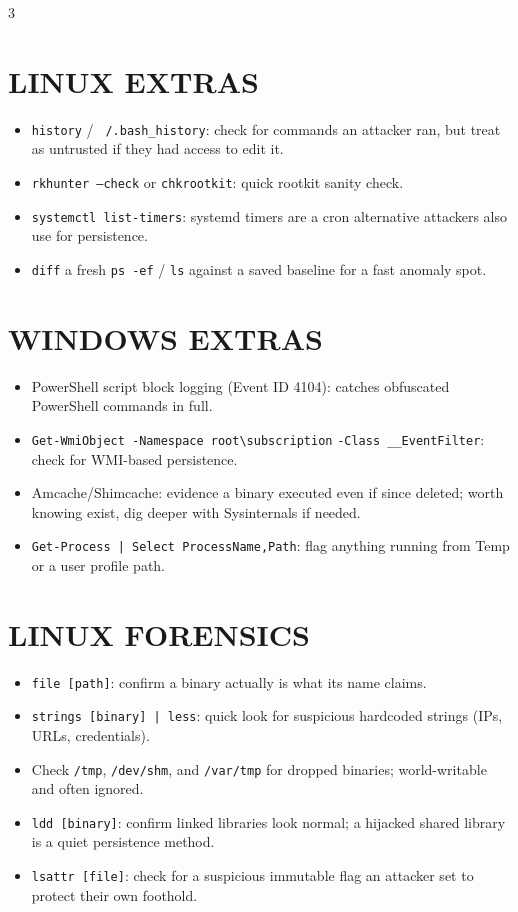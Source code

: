 \documentclass[7pt,landscape]{article}
\begin{document}
\begin{multicols*}{3}
\section{\textcolor{linuxc}{LINUX EXTRAS}}
\begin{itemize}
    \item \texttt{history} / \texttt{~/.bash\_history}: check for commands an attacker ran, but treat as untrusted if they had access to edit it.
    \item \texttt{rkhunter --check} or \texttt{chkrootkit}: quick rootkit sanity check.
    \item \texttt{systemctl list-timers}: systemd timers are a cron alternative attackers also use for persistence.
    \item \texttt{diff} a fresh \texttt{ps -ef} / \texttt{ls} against a saved baseline for a fast anomaly spot.
\end{itemize}

\section{\textcolor{winc}{WINDOWS EXTRAS}}
\begin{itemize}
    \item PowerShell script block logging (Event ID 4104): catches obfuscated PowerShell commands in full.
    \item \texttt{Get-WmiObject -Namespace root\textbackslash subscription} \newline \texttt{-Class \_\_EventFilter}: check for WMI-based persistence.
    \item Amcache/Shimcache: evidence a binary executed even if since deleted; worth knowing exist, dig deeper with Sysinternals if needed.
    \item \texttt{Get-Process | Select ProcessName,Path}: flag anything running from Temp or a user profile path.
\end{itemize}

\section{\textcolor{linuxc}{LINUX FORENSICS}}
\begin{itemize}
    \item \texttt{file [path]}: confirm a binary actually is what its name claims.
    \item \texttt{strings [binary] | less}: quick look for suspicious hardcoded strings (IPs, URLs, credentials).
    \item Check \texttt{/tmp}, \texttt{/dev/shm}, and \texttt{/var/tmp} for dropped binaries; world-writable and often ignored.
    \item \texttt{ldd [binary]}: confirm linked libraries look normal; a hijacked shared library is a quiet persistence method.
    \item \texttt{lsattr [file]}: check for a suspicious immutable flag an attacker set to protect their own foothold.
\end{itemize}


\end{multicols*}
\end{document}
